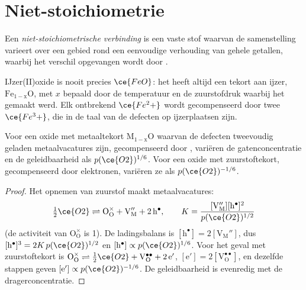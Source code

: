 \section{Niet-stoichiometrie}

\begin{definition}\label{def:b3:solid-state:non-stoichiometric}
Een \emph{niet-stoichiometrische verbinding}
is een vaste stof waarvan de samenstelling varieert over een gebied rond
een eenvoudige verhouding van gehele getallen, waarbij het verschil
opgevangen wordt door .
\end{definition}

IJzer(II)oxide is nooit precies $\ce{FeO}$: het heeft altijd een tekort aan ijzer,
$\mathrm{Fe_{1-x}O}$, met $x$ bepaald door de temperatuur en de zuurstofdruk waarbij het gemaakt werd. Elk ontbrekend $\ce{Fe^2+}$ wordt gecompenseerd door twee
$\ce{Fe^3+}$, die in de taal van de defecten  op ijzerplaatsen zijn.

\begin{proposition}\label{prop:b3:solid-state:brouwer}
Voor een oxide met metaaltekort $\mathrm{M_{1-x}O}$ waarvan de defecten tweevoudig geladen metaalvacatures zijn,
gecompenseerd door , variëren de gatenconcentratie en de
geleidbaarheid als
$p(\ce{O2})^{1/6}$. Voor een oxide met zuurstoftekort, gecompenseerd door elektronen, variëren ze als
$p(\ce{O2})^{-1/6}$.
\end{proposition}

\begin{proof}
Het opnemen van zuurstof maakt metaalvacatures:
\[
  \tfrac12\ce{O2} \rightleftharpoons \mathrm{O_O^{\times} + V_M'' + 2\,h^{\bullet}}, \qquad K = \frac{[\mathrm{V_M''}][\mathrm h^\bullet]^2}{p(\ce{O2})^{1/2}}
\]
(de activiteit van $\mathrm{O_O^{\times}}$ is 1). De
ladingsbalans is $[\mathrm h^\bullet] = 2[\mathrm{V_M''}]$, dus $[\mathrm h^\bullet]^3 = 2K\,p(\ce{O2})^{1/2}$ en $[\mathrm h^\bullet] \propto p(\ce{O2})^{1/6}$. Voor het
geval met zuurstoftekort is $\mathrm{O_O^{\times}} \rightleftharpoons \tfrac12\ce{O2} + \mathrm{V_O^{\bullet\bullet} + 2\,e'}$, $[\mathrm e'] = 2[\mathrm{V_O^{\bullet\bullet}}]$, en dezelfde stappen geven $[\mathrm e'] \propto p(\ce{O2})^{-1/6}$.
De geleidbaarheid is evenredig met de dragerconcentratie.
\end{proof}

